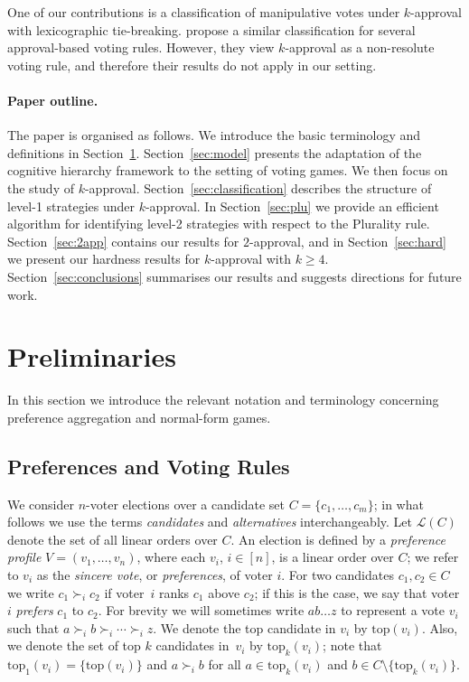 \documentclass[11pt]{article}
\newcommand{\calL}{\mathcal{L}}
\newcommand{\tp}{\mathrm{top}}
\begin{document}
One of our contributions is a classification of manipulative votes under $k$-approval with 
lexicographic tie-breaking. \citet{peters2012manipulability} propose a similar classification for several 
approval-based voting rules. However, they view $k$-approval as a non-resolute voting rule, and therefore 
their results do not apply in our setting.

\paragraph{Paper outline.} The paper is organised as follows.
We introduce the basic terminology and definitions in Section~\ref{sec:prelim}.
Section~\ref{sec:model} presents the adaptation of the cognitive hierarchy framework to the setting of voting games.
We then focus on the study of $k$-approval. Section~\ref{sec:classification} 
describes the structure of level-1 strategies under $k$-approval.
In Section~\ref{sec:plu} we provide an efficient algorithm for identifying level-2
strategies with respect to the Plurality rule. Section~\ref{sec:2app}
contains our results for $2$-approval, and in Section~\ref{sec:hard} we present
our hardness results for $k$-approval with $k\ge 4$.  
Section~\ref{sec:conclusions} summarises our results and suggests directions for future work.


\section{Preliminaries}\label{sec:prelim}
In this section we introduce the relevant notation and terminology 
concerning preference aggregation and normal-form games.
\subsection{Preferences and Voting Rules}
We consider $n$-voter elections over a candidate set $C=\{c_1, \dots, c_m\}$; in what follows we use
the terms {\em candidates} and {\em alternatives} interchangeably. Let $\calL(C)$ denote the set
of all linear orders over $C$.
An election is defined by a {\em preference profile} $V=(v_1, \dots, v_n)$, where each $v_i$,
$i\in [n]$, is a linear order over $C$; we refer to $v_i$ as the {\em sincere vote}, or {\em preferences}, of voter $i$.
For two candidates $c_1, c_2\in C$ we write $c_1\succ_i c_2$ if voter~$i$ ranks $c_1$ above $c_2$; 
if this is the case, we say that voter $i$ {\em prefers} $c_1$ to $c_2$.
For brevity we will sometimes write $ab\dots z$ to represent a vote $v_i$ such that $a\succ_i b\succ_i\cdots\succ_i z$.
We denote the top candidate in $v_i$ by $\tp(v_i)$.  Also, we denote the set of top $k$ candidates in~$v_i$
by $\tp_k(v_i)$; note that $\tp_1(v_i)=\{\tp(v_i)\}$ and
$a\succ_i b$ for all $a\in\tp_k(v_i)$ and $b\in C\setminus\{\tp_k(v_i)\}$.
\end{document}
